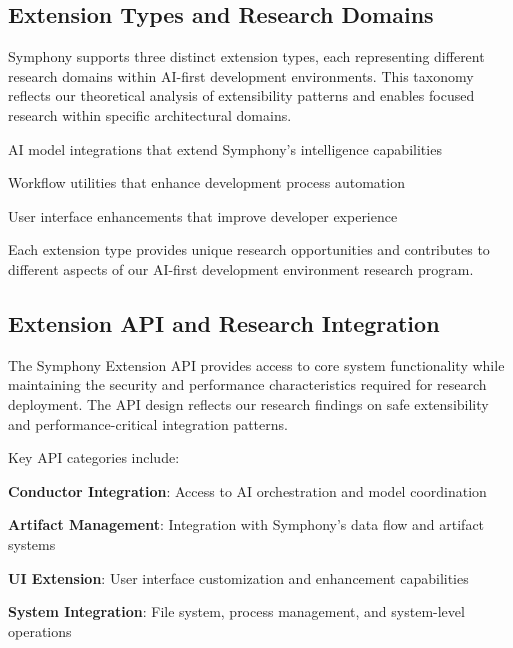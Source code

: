 \subsection*{Extension Types and Research Domains}

Symphony supports three distinct extension types, each representing different research domains within AI-first development environments. This taxonomy reflects our theoretical analysis of extensibility patterns and enables focused research within specific architectural domains.

\begin{description}[leftmargin=4cm,labelwidth=3.5cm]
    \item[\textbf{Instruments}] AI model integrations that extend Symphony's intelligence capabilities
    \item[\textbf{Operators}] Workflow utilities that enhance development process automation
    \item[\textbf{Motifs}] User interface enhancements that improve developer experience
\end{description}

Each extension type provides unique research opportunities and contributes to different aspects of our AI-first development environment research program.

\subsection*{Extension API and Research Integration}

The Symphony Extension API provides access to core system functionality while maintaining the security and performance characteristics required for research deployment. The API design reflects our research findings on safe extensibility and performance-critical integration patterns.

Key API categories include:
\begin{expandedlist}
    \item \textbf{Conductor Integration}: Access to AI orchestration and model coordination
    \item \textbf{Artifact Management}: Integration with Symphony's data flow and artifact systems
    \item \textbf{UI Extension}: User interface customization and enhancement capabilities
    \item \textbf{System Integration}: File system, process management, and system-level operations
\end{expandedlist}

